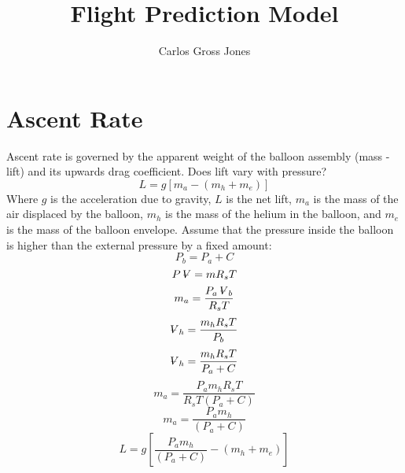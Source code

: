 \documentclass[]{article}
\title{Flight Prediction Model}
\author{Carlos Gross Jones}
\newcommand{\volume}{\mathop{\ooalign{\hfil$V$\hfil\cr\kern0.08em--\hfil\cr}}\nolimits}
\begin{document}
\maketitle

\begin{abstract}

\end{abstract}

\section{Ascent Rate}
\par Ascent rate is governed by the apparent weight of the balloon assembly (mass - lift) and its upwards drag coefficient. Does lift vary with pressure?
\begin{equation}
L=g[m_a-(m_h+m_e)]
\end{equation}
Where $g$ is the acceleration due to gravity, $L$ is the net lift, $m_a$ is the mass of the air displaced by the balloon, $m_h$ is the mass of the helium in the balloon, and $m_e$ is the mass of the balloon envelope.
Assume that the pressure inside the balloon is higher than the external pressure by a fixed amount:
\begin{equation}
P_b=P_a+C
\end{equation}
\begin{equation}
P\volume=mR_sT
\end{equation}
\begin{equation}
m_a=\frac{P_a\volume_b}{R_sT}
\end{equation}
\begin{equation}
\volume_h=\frac{m_hR_sT}{P_b}
\end{equation}
\begin{equation}
\volume_h=\frac{m_hR_sT}{P_a+C}
\end{equation}
\begin{equation}
m_a=\frac{P_am_hR_sT}{R_sT(P_a+C)}
\end{equation}
\begin{equation}
m_a=\frac{P_am_h}{(P_a+C)}
\end{equation}
\begin{equation}
L=g[\frac{P_am_h}{(P_a+C)}-(m_h+m_e)]
\end{equation}
\end{document}
